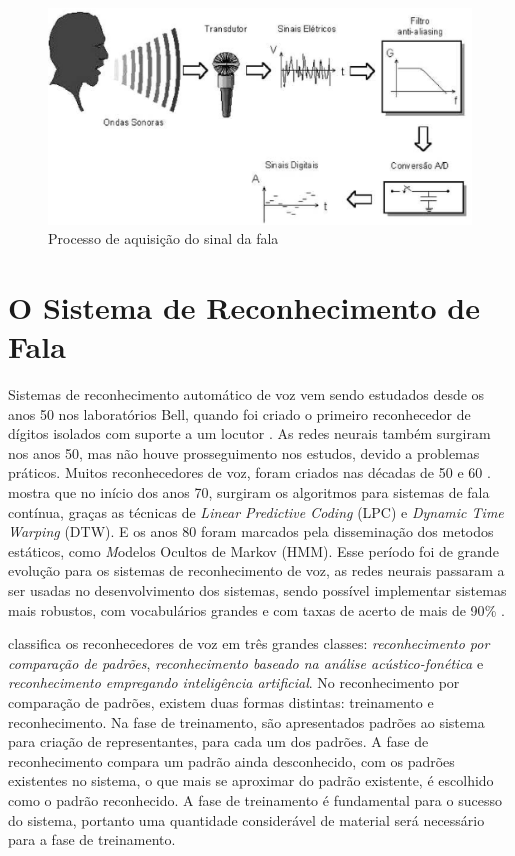\begin{figure}
\includegraphics[width=1\textwidth]{graficos/aquisicao_fala.eps}
\caption{Processo de aquisição do sinal da fala}
\end{figure}


\section{O Sistema de Reconhecimento de Fala}

Sistemas de reconhecimento automático de voz vem sendo estudados desde os anos 50 nos laboratórios Bell, quando foi criado o primeiro reconhecedor de dígitos isolados com suporte a um locutor \cite{MetodosProAnderson}. As redes neurais também surgiram nos anos 50, mas não houve prosseguimento nos estudos, devido a problemas práticos. Muitos reconhecedores de voz, foram criados nas décadas de 50 e 60 \cite{RavSpeechSadaoki}.  mostra que no início dos anos 70, surgiram os algoritmos para sistemas de fala contínua, graças as técnicas de \textit{Linear Predictive Coding} (LPC) e \textit{Dynamic Time Warping} (DTW). E os anos 80 foram marcados pela disseminação dos metodos estáticos, como \textit Modelos Ocultos de Markov (HMM). Esse período foi de grande evolução para os sistemas de reconhecimento de voz, as redes neurais passaram a ser usadas no desenvolvimento dos sistemas, sendo possível implementar sistemas mais robustos, com vocabulários grandes e com taxas de acerto de mais de 90{\%} \cite{AvaliaTecJose}.

 classifica os reconhecedores de voz em três grandes classes: \textit{reconhecimento por comparação de padrões}, \textit{reconhecimento baseado na análise acústico-fonética} e \textit{reconhecimento empregando inteligência artificial}. No reconhecimento por comparação de padrões, existem duas formas distintas: treinamento e reconhecimento. Na fase de treinamento, são apresentados padrões ao sistema para criação de representantes, para cada um dos padrões. A fase de reconhecimento compara um padrão ainda desconhecido, com os padrões existentes no sistema, o que mais se aproximar do padrão existente, é escolhido como o padrão reconhecido. A fase de treinamento é fundamental para o sucesso do sistema, portanto uma quantidade considerável de material será necessário para a fase de treinamento. 

